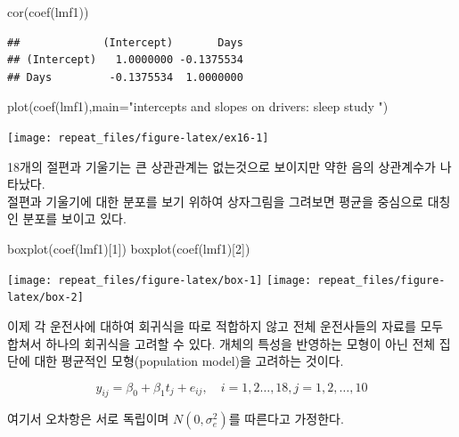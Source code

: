 \documentclass[
]{book}
\newenvironment{Shaded}{\begin{snugshade}}{\end{snugshade}}
\newcommand{\AttributeTok}[1]{\textcolor[rgb]{0.77,0.63,0.00}{#1}}
\newcommand{\DecValTok}[1]{\textcolor[rgb]{0.00,0.00,0.81}{#1}}
\newcommand{\FunctionTok}[1]{\textcolor[rgb]{0.00,0.00,0.00}{#1}}
\newcommand{\NormalTok}[1]{#1}
\newcommand{\StringTok}[1]{\textcolor[rgb]{0.31,0.60,0.02}{#1}}
\theoremstyle{definition}
\theoremstyle{definition}
\theoremstyle{definition}
\theoremstyle{remark}
\begin{document}
\begin{Shaded}
\begin{Highlighting}[]
\FunctionTok{cor}\NormalTok{(}\FunctionTok{coef}\NormalTok{(lmf1))}
\end{Highlighting}
\end{Shaded}

\begin{verbatim}
##             (Intercept)       Days
## (Intercept)   1.0000000 -0.1375534
## Days         -0.1375534  1.0000000
\end{verbatim}

\begin{Shaded}
\begin{Highlighting}[]
\FunctionTok{plot}\NormalTok{(}\FunctionTok{coef}\NormalTok{(lmf1),}\AttributeTok{main=}\StringTok{"intercepts and slopes on drivers: sleep study "}\NormalTok{)}
\end{Highlighting}
\end{Shaded}

\texttt{[image: repeat\_files/figure-latex/ex16-1]}

18개의 절편과 기울기는 큰 상관관계는 없는것으로 보이지만 약한 음의 상관계수가 나타났다.\\
절편과 기울기에 대한 분포를 보기 위하여 상자그림을 그려보면 평균을 중심으로 대칭인 분포를 보이고 있다.

\begin{Shaded}
\begin{Highlighting}[]
\FunctionTok{boxplot}\NormalTok{(}\FunctionTok{coef}\NormalTok{(lmf1)[}\DecValTok{1}\NormalTok{])}
\FunctionTok{boxplot}\NormalTok{(}\FunctionTok{coef}\NormalTok{(lmf1)[}\DecValTok{2}\NormalTok{])}
\end{Highlighting}
\end{Shaded}

\texttt{[image: repeat\_files/figure-latex/box-1]} \texttt{[image: repeat\_files/figure-latex/box-2]}

이제 각 운전사에 대하여 회귀식을 따로 적합하지 않고 전체 운전사들의 자료를 모두 합쳐서 하나의 회귀식을 고려할 수 있다. 개체의 특성을 반영하는 모형이 아닌 전체 집단에 대한 평균적인 모형(population model)을 고려하는 것이다.

\begin{equation} 
y_{ij} = \beta_0 + \beta_1 t_j + e_{ij} ,\quad i=1,2\dots,18,  j=1,2, \dots, 10 
\label{eq:popmodel}
\end{equation}

여기서 오차항은 서로 독립이며 \(N(0, \sigma^2_e)\)를 따른다고 가정한다.
\end{document}
